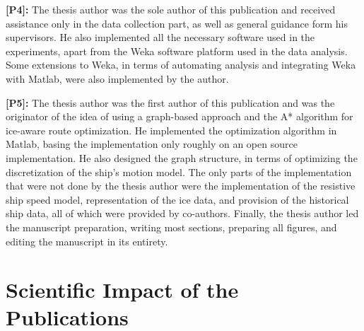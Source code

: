 \textbf{[P4]:} The thesis author was the sole author of this publication and received assistance only in the data collection part, as well as general guidance form his supervisors. He also implemented all the necessary software used in the experiments, apart from the Weka software platform used in the data analysis. Some extensions to Weka, in terms of automating analysis and integrating Weka with Matlab, were also implemented by the author.

\textbf{[P5]:} The thesis author was the first author of this publication and was the originator of the idea of using a graph-based approach and the A* algorithm for ice-aware route optimization. He implemented the optimization algorithm in Matlab, basing the implementation only roughly on an open source implementation. He also designed the graph structure, in terms of optimizing the discretization of the ship's motion model. The only parts of the implementation that were not done by the thesis author were the implementation of the resistive ship speed model, representation of the ice data, and provision of the historical ship data, all of which were provided by co-authors. Finally, the thesis author led the manuscript preparation, writing most sections, preparing all figures, and editing the manuscript in its entirety.

\section{Scientific Impact of the Publications}
\label{sec:impact}

